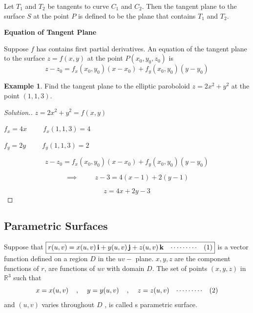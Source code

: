 \documentclass[11pt,a4paper]{article}
\theoremstyle{definition}
\newtheorem{exa}[thm]{Example}
\newenvironment{solution}
  {\renewcommand{\qedsymbol}{}\begin{proof}[\textit{Solution}.]}
  {\end{proof}}
\newcommand{\subhead}[1]{%
  \par\medskip\noindent\textbf{#1}\par\nobreak\smallskip}
\begin{document}
Let $T_1$ and $T_2$ be tangents to curve $C_1$ and $C_2$. Then the tangent plane to the surface $S$ at the point $P$ is defined to be the plane that contains $T_1$ and $T_2$.


\subhead{Equation of Tangent Plane}


Suppose $f$ has contains first partial derivatives. An equation of the tangent plane to the surface $z = f(x,y)$ at the point $P(x_0, y_0, z_0)$ is $$z -z_0 = f_x(x_0,y_0)(x-x_0) + f_y(x_0,y_0)(y-y_0)$$


\begin{exa}


Find the tangent plane to the elliptic paroboloid $z = 2x^2 + y^2$ at the point $(1,1,3)$.
\end{exa}


\begin{solution}


$z = 2x^2 + y^2 = f(x,y)$


$f_x = 4x\hspace{1cm} f_x(1,1,3) = 4$


$f_y = 2y\hspace{1cm} f_y(1,1,3) = 2$

$$ z -z_0 = f_x(x_0,y_0)(x-x_0) + f_y(x_0,y_0)(y-y_0)$$

$$\implies \hspace{1cm} z - 3 = 4(x-1) + 2(y-1)$$

$$z = 4x + 2y -3$$


\pagebreak
\end{solution}

{\color[wave]{485}\subsection{Parametric Surfaces}}

Suppose that
 $\boxed{\displaystyle{r(u,v) = x(u,v)\,\textbf{i} + y(u,v)\,\textbf{j} + z(u,v)\,\textbf{k}}\hspace{0.3cm}\cdots\cdots\cdots\hspace{0.3cm}(1)}$ is a vector function defined on a region $D$ in the $uv-$ plane.
$x, y, z$ are the component functions of $r$, are functions of $uv$ with domain $D$. The set of points $(x,y,z)$ in $\mathbb{R}^3$ such that
$$x = x(u,v)\hspace{0.4cm},\hspace{0.4cm} y = y(u,v)\hspace{0.4cm}, \hspace{0.4cm} z = z(u,v)\hspace{0.3cm}\cdots\cdots\cdots \hspace{0.3cm}(2)$$ and $(u,v)$ varies throughout $D$ , is called s parametric surface.
\end{document}
